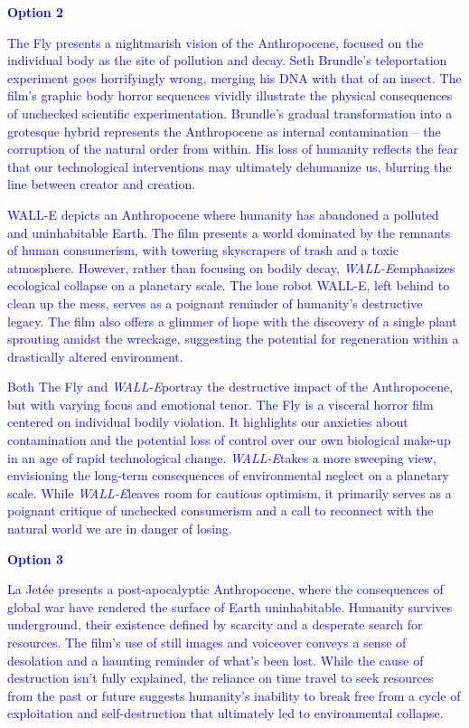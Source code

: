 \documentclass[11pt,fleqn]{book} %
\begin{document}
\begin{exercise}
\textcolor{blue}{
\textbf{Option 2}
}

\textcolor{blue}{
The Fly presents a nightmarish vision of the Anthropocene, focused on the individual body as the site of pollution and decay. Seth Brundle's teleportation experiment goes horrifyingly wrong, merging his DNA with that of an insect. The film's graphic body horror sequences vividly illustrate the physical consequences of unchecked scientific experimentation. Brundle's gradual transformation into  a grotesque hybrid represents the Anthropocene as internal contamination – the corruption of the natural order from within. His loss of humanity reflects the fear that our technological interventions may ultimately dehumanize us, blurring the line between creator and creation.
}

\textcolor{blue}{
WALL-E depicts an Anthropocene where humanity has abandoned a polluted and uninhabitable Earth. The film presents a world dominated by the remnants of human consumerism, with towering skyscrapers of trash and a toxic atmosphere. However, rather than focusing on bodily decay, \textit{WALL-E}emphasizes ecological collapse on a planetary scale. The lone robot WALL-E, left behind to clean up the mess, serves as a poignant reminder of humanity's destructive legacy. The film also offers a glimmer of hope with the discovery of a single plant sprouting amidst the wreckage, suggesting the potential for regeneration within a drastically altered environment.
}

\textcolor{blue}{
Both The Fly and \textit{WALL-E}portray the destructive impact of the Anthropocene, but with varying focus and emotional tenor. The Fly is a visceral horror film centered on individual bodily violation. It highlights our anxieties about contamination and the potential loss of control over our own biological make-up in an age of rapid technological change. \textit{WALL-E}takes a more sweeping view, envisioning the long-term consequences of environmental neglect on a planetary scale. While \textit{WALL-E}leaves room for cautious optimism, it primarily serves as a poignant critique of unchecked consumerism and a call to reconnect with the natural world we are in danger of losing.
}

\textcolor{blue}{
\textbf{Option 3}
}

\textcolor{blue}{
La Jetée presents a post-apocalyptic Anthropocene, where the consequences of global war have rendered the surface of Earth uninhabitable. Humanity survives underground, their existence defined by scarcity and a desperate search for resources. The film's use of still images and voiceover conveys a sense of desolation and a haunting reminder of what's been lost. While the cause of destruction isn't fully explained, the reliance on time travel to seek resources from the past or future suggests humanity's inability to break free from a cycle of exploitation and self-destruction that ultimately led to environmental collapse.
}


\end{exercise}
\end{document}
